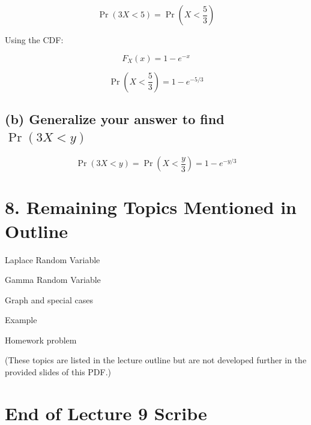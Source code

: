 \documentclass[12pt]{article}
\begin{document}
\[
\Pr(3X < 5) = \Pr\left(X < \frac{5}{3}\right)
\]

Using the CDF:

\[
F_X(x) = 1 - e^{-x}
\]

\[
\Pr\left(X < \frac{5}{3}\right)
= 1 - e^{-5/3}
\]

\subsection*{(b) Generalize your answer to find $\Pr(3X < y)$}

\[
\Pr(3X < y) = \Pr\left(X < \frac{y}{3}\right)
= 1 - e^{-y/3}
\]

\section*{8. Remaining Topics Mentioned in Outline}

Laplace Random Variable

Gamma Random Variable

Graph and special cases

Example

Homework problem

(These topics are listed in the lecture outline but are not developed further in the provided slides of this PDF.)

\section*{End of Lecture 9 Scribe}
\end{document}
